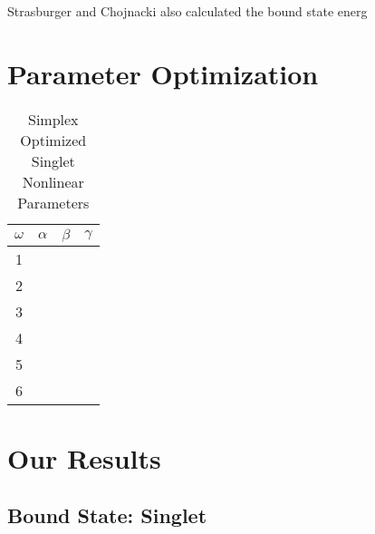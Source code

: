 \documentclass[Dissertation.tex]{subfiles}
\begin{document}
Strasburger and Chojnacki \cite{Strasburger1998} also calculated the bound state energ


\section{Parameter Optimization}
\label{sec:BoundOptimization}


\setlength{\abovecaptionskip}{6pt}   %
\setlength{\belowcaptionskip}{6pt}   %
\begin{table}[ht]
\caption{Simplex Optimized Singlet Nonlinear Parameters} %
\centering
\begin{tabular}{c c c c}
\hline\hline
$\omega$ & $\alpha$ & $\beta$ & $\gamma$ \\ [0.5ex]
\hline
1 &  &  &  \\
2 &  &  &  \\
3 &  &  &  \\
4 &  &  &  \\
5 &  &  &  \\
6 &  &  &  \\
\hline\hline
\end{tabular}
\label{table:NonlinearOptimized1SSimplex}
\end{table}


\section{Our Results}
\label{sec:BoundResults}

\subsection{Bound State: Singlet}
\end{document}
